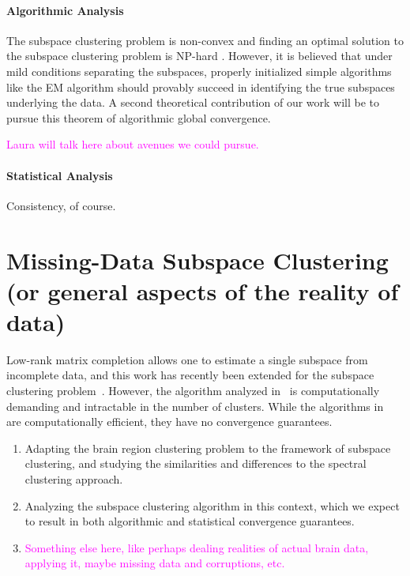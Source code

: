 \documentclass[times,11pt]{article} %
\newcommand{\laura}{\textcolor{magenta}}
\begin{document}
\paragraph{Algorithmic Analysis} The subspace clustering problem is non-convex and finding an optimal solution to the subspace clustering problem is NP-hard \cite{vidaltutorial}. However, it is believed that under mild conditions separating the subspaces, properly initialized simple algorithms like the EM algorithm should provably succeed in identifying the true subspaces underlying the data. A second theoretical contribution of our work will be to pursue this theorem of algorithmic global convergence.

\laura{Laura will talk here about avenues we could pursue. }

\paragraph{Statistical Analysis} Consistency, of course.



\section{Missing-Data Subspace Clustering (or general aspects of the reality of data)}


Low-rank matrix completion allows one to estimate a single subspace from incomplete data, and this work has recently been extended for the subspace clustering problem~\cite{hrmc, balzano2012ssp, pimentel2014}. However, the algorithm analyzed in~\cite{hrmc} is computationally demanding and intractable in the number of clusters. While the algorithms in~\cite{balzano2012ssp, pimentel2014} are computationally efficient, they have no convergence guarantees. 




\begin{enumerate}
\item Adapting the brain region clustering problem to the framework of subspace clustering, and studying the similarities and differences to the spectral clustering approach.
\item Analyzing the subspace clustering algorithm in this context, which we expect to result in both algorithmic and statistical convergence guarantees.
\item \laura{Something else here, like perhaps dealing realities of actual brain data, applying it, maybe missing data and corruptions, etc.}
\end{enumerate}



\setcounter{page}{1}
\renewcommand\thepage{F-\arabic{page}}


\end{document}
